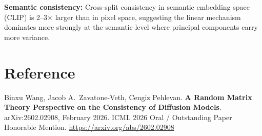 \documentclass[10pt,twocolumn]{article}
\begin{document}
\textbf{Semantic consistency:} Cross-split consistency in semantic
embedding space (CLIP) is 2--3$\times$ larger than in pixel space,
suggesting the linear mechanism dominates more strongly at the semantic
level where principal components carry more variance.

\section*{Reference}

Binxu Wang, Jacob A.\ Zavatone-Veth, Cengiz Pehlevan.
\textbf{A Random Matrix Theory Perspective on the Consistency of
Diffusion Models}.
arXiv:2602.02908, February 2026. ICML 2026 Oral / Outstanding Paper Honorable Mention.
\url{https://arxiv.org/abs/2602.02908}
\end{document}
